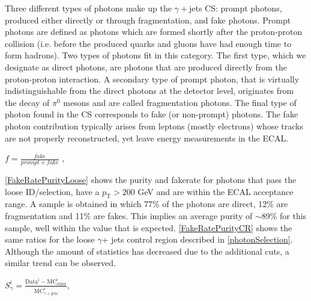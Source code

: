 Three different types of photons make up the $\gamma+$jets CS: prompt photons, produced either directly or through fragmentation, and fake photons. Prompt photons are defined as photons which are formed shortly after the proton-proton collision (i.e. before the produced quarks and gluons have had enough time to form hadrons). Two types of photons fit in this category. The first type, which we designate as direct photons, are photons that are produced directly from the proton-proton interaction\cite{promptPho}. A secondary type of prompt photon, that is virtually indistinguishable from the direct photons at the detector level, originates from the decay of $\pi^0$ mesons and are called fragmentation photons. The final type of photon found in the CS corresponds to fake (or non-prompt) photons. The fake photon contribution typically arises from leptons (mostly electrons) whose tracks are not properly reconstructed, yet leave energy measurements in the ECAL.

\begingroup
	\large
	\begin{center}
		$f = \frac{fake}{prompt+fake}$ ,
	\end{center}
\endgroup
\vspace{1em}

\autoref{FakeRatePurityLoose} shows the purity and fakerate for photons that pass the loose ID/selection, have a $p_\text{T} > 200$ GeV and are within the ECAL acceptance range. A sample is obtained in which 77\% of the photons are direct, 12\% are fragmentation and 11\% are fakes. This implies an average purity of $\sim$89\% for this sample, well within the value that is expected. \autoref{FakeRatePurityCR} shows the same ratios for the loose $\gamma$+ jets control region described in \autoref{photonSelection}. Although the amount of statistics has decreased due to the additional cuts, a similar trend can be observed.


\begingroup
	\Large
	\begin{center}
		$S^{i}_{\gamma} = \frac{\text{Data}^{i} - \text{M}\text{C}^{i}_\text{other}}{\text{M}\text{C}_{\gamma+\text{jets}}^i}$,
	\end{center}
\endgroup


